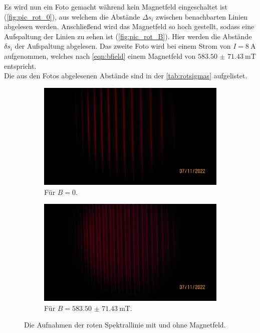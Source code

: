   \noindent 
  Es wird nun ein Foto gemacht während kein Magnetfeld eingeschaltet ist (\autoref{fig:pic_rot_0}), aus welchem die Abstände $\Delta s_i$ zwischen benachbarten Linien
  abgelesen werden. Anschließend wird das Magnetfeld so hoch gestellt, sodass eine Aufspaltung der Linien zu sehen ist (\autoref{fig:pic_rot_B}). 
  Hier werden die Abstände $\delta s_i$ der Aufspaltung abgelesen.  
  Das zweite Foto wird bei einem Strom von $I = \SI{8}{\ampere}$ aufgenommen, welches nach \eqref{eqn:bfield} einem Magnetfeld von $\SI{583.50(7143)}{\milli\tesla}$
  entspricht. \\
  Die aus den Fotos abgelesenen Abstände sind in der \autoref{tab:rotsigmas} aufgelistet. 
  \begin{figure}%
    \begin{subfigure}{0.48\textwidth}%
      \centering%
      \includegraphics[width=\textwidth]{pictures/IMG_0005.JPG}%
      \caption{Für $B = \num{0}$.}%
      \label{fig:pic_rot_0}%
    \end{subfigure}%
    \hfill%
    \begin{subfigure}{0.48\textwidth}%
      \centering%
      \includegraphics[width=\textwidth]{pictures/IMG_0006.JPG}%
      \caption{Für $B = \SI{583.50(7143)}{\milli\tesla}$.}%
      \label{fig:pic_rot_B}%
    \end{subfigure}%
    \caption{Die Aufnahmen der roten Spektrallinie mit und ohne Magnetfeld.}%
    \label{fig:rot}%
  \end{figure}

